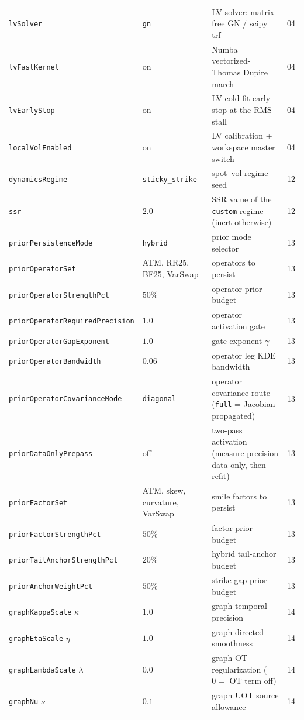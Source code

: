 \documentclass[11pt]{article}
\begin{document}
\begin{longtable}{p{}p{}p{}r}
\texttt{lvSolver} & \texttt{gn} & LV solver: matrix-free GN / scipy trf & 04\\
\texttt{lvFastKernel} & on & Numba vectorized-Thomas Dupire march & 04\\
\texttt{lvEarlyStop} & on & LV cold-fit early stop at the RMS stall & 04\\
\texttt{localVolEnabled} & on & LV calibration + workspace master switch & 04\\
\texttt{dynamicsRegime} & \texttt{sticky\_strike} & spot--vol regime seed & 12\\
\texttt{ssr} & $2.0$ & SSR value of the \texttt{custom} regime (inert
otherwise) & 12\\
\texttt{priorPersistenceMode} & \texttt{hybrid} & prior mode selector & 13\\
\texttt{priorOperatorSet} & ATM, RR25, BF25, VarSwap & operators to persist & 13\\
\texttt{priorOperatorStrengthPct} & $50\%$ & operator prior budget & 13\\
\texttt{priorOperatorRequiredPrecision} & $1.0$ & operator activation gate & 13\\
\texttt{priorOperatorGapExponent} & $1.0$ & gate exponent $\gamma$ & 13\\
\texttt{priorOperatorBandwidth} & $0.06$ & operator leg KDE bandwidth & 13\\
\texttt{priorOperatorCovarianceMode} & \texttt{diagonal} & operator covariance
route (\texttt{full} = Jacobian-propagated) & 13\\
\texttt{priorDataOnlyPrepass} & off & two-pass activation (measure precision
data-only, then refit) & 13\\
\texttt{priorFactorSet} & ATM, skew, curvature, VarSwap & smile factors to persist & 13\\
\texttt{priorFactorStrengthPct} & $50\%$ & factor prior budget & 13\\
\texttt{priorTailAnchorStrengthPct} & $20\%$ & hybrid tail-anchor budget & 13\\
\texttt{priorAnchorWeightPct} & $50\%$ & strike-gap prior budget & 13\\
\texttt{graphKappaScale} $\kappa$ & $1.0$ & graph temporal precision & 14\\
\texttt{graphEtaScale} $\eta$ & $1.0$ & graph directed smoothness & 14\\
\texttt{graphLambdaScale} $\lambda$ & $0.0$ & graph OT regularization ($0=$ OT
term off) & 14\\
\texttt{graphNu} $\nu$ & $0.1$ & graph UOT source allowance & 14\\

\end{longtable}
\end{document}
